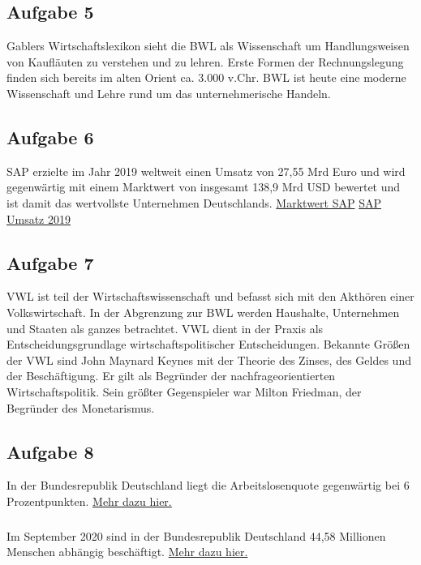 \documentclass{article}
\begin{document}
	\subsection*{Aufgabe 5}
	
	Gablers Wirtschaftslexikon sieht die BWL als Wissenschaft um Handlungsweisen von Kaufläuten zu verstehen und zu lehren. Erste Formen der Rechnungslegung finden sich bereits im alten Orient ca. 3.000 v.Chr. BWL ist heute eine moderne Wissenschaft und Lehre rund um das unternehmerische Handeln.
	
	\subsection*{Aufgabe 6}
	
	SAP erzielte im Jahr 2019 weltweit einen Umsatz von 27,55 Mrd Euro und wird gegenwärtig mit einem Marktwert von insgesamt 138,9 Mrd USD bewertet und ist damit das wertvollste Unternehmen Deutschlands.
	\href{https://www.gevestor.de/details/die-top-10-der-wertvollsten-unternehmen-in-deutschland-718613.html}{Marktwert SAP} \href{https://de.statista.com/statistik/daten/studie/28261/umfrage/umsatz-des-unternehmens-sap-seit-dem-jahr-2001/
	}{SAP Umsatz 2019}
	
	\subsection*{Aufgabe 7}
	VWL ist teil der Wirtschaftswissenschaft und befasst sich mit den Akthören einer Volkswirtschaft. In der Abgrenzung zur BWL werden Haushalte, Unternehmen und Staaten als ganzes betrachtet. VWL dient in der Praxis als Entscheidungsgrundlage wirtschaftspolitischer Entscheidungen. Bekannte Größen der VWL sind John Maynard Keynes mit der Theorie des Zinses, des Geldes und der Beschäftigung. Er gilt als Begründer der nachfrageorientierten Wirtschaftspolitik. Sein größter Gegenspieler war Milton Friedman, der Begründer des Monetarismus.
	
	\subsection*{Aufgabe 8}
	In der Bundesrepublik Deutschland liegt die Arbeitslosenquote gegenwärtig bei 6 Prozentpunkten.
	\href{https://de.statista.com/statistik/daten/studie/1239/umfrage/aktuelle-arbeitslosenquote-in-deutschland-monatsdurchschnittswerte/}{Mehr dazu hier.}

	\subparagraph*{}
	Im September 2020 sind in der Bundesrepublik Deutschland 44,58 Millionen Menschen abhängig beschäftigt.	
	\href{https://de.statista.com/statistik/daten/studie/1376/umfrage/anzahl-der-erwerbstaetigen-mit-wohnort-in-deutschland/
	}{Mehr dazu hier.}
	
\end{document}
